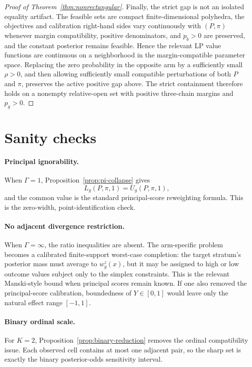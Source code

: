 \documentclass[11pt]{article}
\theoremstyle{definition}
\theoremstyle{plain}
\theoremstyle{remark}
\begin{document}
\begin{proof}[Proof of Theorem~\ref{thm:nonrectangular}]
Finally, the strict gap is not an isolated equality artifact.  The feasible
sets are compact finite-dimensional polyhedra, the objectives and calibration
right-hand sides vary continuously with \((P,\pi)\) whenever margin
compatibility, positive denominators, and \(p_b>0\) are preserved, and the
constant posterior remains feasible.  Hence the relevant LP value functions
are continuous on a neighborhood in the margin-compatible parameter space.
Replacing the zero probability in the opposite arm by a sufficiently small
\(\rho>0\), and then allowing sufficiently small compatible perturbations of
both \(P\) and \(\pi\), preserves the active positive gap above.  The strict
containment therefore holds on a nonempty relative-open set with positive
three-chain margins and \(p_g>0\).
\end{proof}

\section{Sanity checks}
\paragraph{Principal ignorability.}
When \(\Gamma=1\), Proposition~\ref{prop:pi-collapse} gives
\[
  L_g(P,\pi,1)=U_g(P,\pi,1),
\]
and the common value is the standard principal-score reweighting formula.  This
is the zero-width, point-identification check.

\paragraph{No adjacent divergence restriction.}
When \(\Gamma=\infty\), the ratio inequalities are absent.  The arm-specific
problem becomes a calibrated finite-support worst-case completion: the target
stratum's posterior mass must average to \(w^z_g(x)\), but it may be assigned
to high or low outcome values subject only to the simplex constraints.  This is
the relevant Manski-style bound when principal scores remain known.  If one
also removed the principal-score calibration, boundedness of \(Y\in[0,1]\)
would leave only the natural effect range \([-1,1]\).

\paragraph{Binary ordinal scale.}
For \(K=2\), Proposition~\ref{prop:binary-reduction} removes the ordinal
compatibility issue.  Each observed cell contains at most one adjacent pair, so
the sharp set is exactly the binary posterior-odds sensitivity interval.
\end{document}
